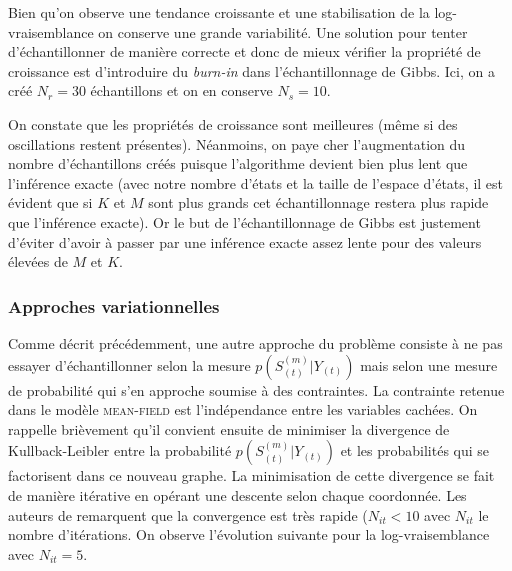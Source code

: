 \documentclass[10pt,a4paper]{article}
\newcommand{\meanfield}{\textsc{mean-field}}
\begin{document}
  Bien qu'on observe une tendance croissante et une stabilisation de la 
log-vraisemblance on conserve une grande variabilité.
Une solution pour tenter d'échantillonner de manière correcte et donc de mieux
vérifier la propriété de croissance est d'introduire du \textit{burn-in} dans
l'échantillonnage de Gibbs.
Ici, on a créé $N_r = 30$ échantillons et on en conserve $N_s = 10$.

On constate que les propriétés de croissance sont meilleures (même si des 
oscillations restent présentes). Néanmoins, on paye cher l'augmentation du 
nombre d'échantillons créés puisque l'algorithme devient bien plus lent que 
l'inférence exacte (avec notre nombre d'états et la taille de l'espace d'états, 
il est évident que si $K$ et $M$ sont plus grands cet échantillonnage restera 
plus rapide que l'inférence exacte). Or le but de l'échantillonnage de Gibbs 
est justement d'éviter d'avoir à passer par une inférence exacte assez lente 
pour des valeurs élevées de $M$ et $K$.

\subsubsection{Approches variationnelles}

Comme décrit précédemment, une autre approche du problème consiste à ne pas 
essayer d'échantillonner selon la mesure $p(S_{(t)}^{(m)} \vert Y_{(t)})$ mais 
selon une mesure de probabilité qui s'en approche soumise à des contraintes.
La  contrainte retenue dans le modèle \meanfield{} est l'indépendance entre les 
variables cachées. On rappelle brièvement qu'il convient ensuite de minimiser 
la divergence de Kullback-Leibler entre la probabilité $p(S_{(t)}^{(m)} \vert 
Y_{(t)})$ et les probabilités qui se factorisent dans ce nouveau graphe.
La  minimisation de cette divergence se fait de manière itérative en opérant
une  descente selon chaque coordonnée.
Les auteurs de \cite{ghahramani1997factorial} remarquent que la convergence est
très rapide ($N_{it}< 10$ avec $N_{it}$ le nombre d'itérations.
On observe l'évolution suivante pour la log-vraisemblance  avec $N_{it} = 5$.
\end{document}
